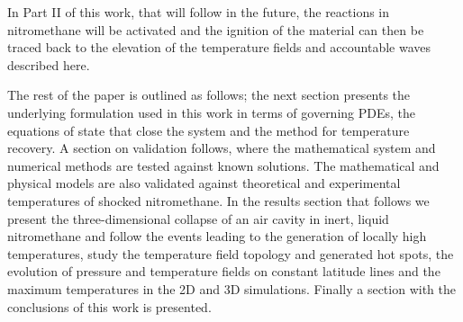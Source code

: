 \documentclass[3p,times,twocolumn]{elsarticle}
\begin{document}
 In Part II of this work, that will follow in the future, the reactions in nitromethane will be activated and the ignition of the material can then be traced back to the elevation of the temperature fields and accountable waves described here. 


The rest of the paper is  outlined as follows; the next section presents the underlying formulation used in this work in terms of governing PDEs, the equations of state that close the system and the method for temperature recovery. A section on validation follows, where the mathematical system and numerical methods are tested against known solutions. The mathematical and physical models are also validated against theoretical and experimental temperatures of shocked nitromethane.
In the results section that follows we present the three-dimensional collapse of an air cavity in inert, liquid nitromethane and follow the events leading to the generation of locally high temperatures, study the temperature field topology and generated hot spots, the evolution of pressure and temperature fields on constant latitude lines and the maximum temperatures in the 2D and 3D simulations. Finally a section with the conclusions of this work is presented.
\end{document}
